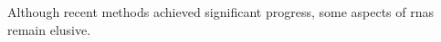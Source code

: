 

Although recent methods achieved significant progress, some aspects of \glspl{rna} remain elusive.
